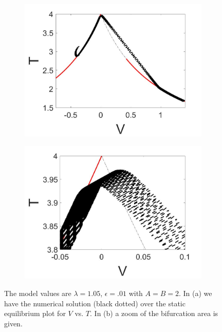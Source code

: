 \begin{figure}[H]
\centering
\begin{subfigure}{.5\textwidth}
 \centering
 \includegraphics[width=\linewidth]{twoD/slowosc_Tplot_medium.jpg}
 \caption{}
\end{subfigure}%
\begin{subfigure}{.5\textwidth}
 \centering
 \includegraphics[width=\linewidth]{twoD/slowosc_Tplot_medium_zoom.jpg}
 \caption{}
\end{subfigure}
\caption{The model values are $\lambda=1.05$, $\epsilon=.01$ with $A=B=2$. In (a) we have the numerical solution (black dotted) over the static equilibrium plot for $V$ vs. $T$. In (b) a zoom of the bifurcation area is given.}
\label{fig:twoD_slowosc_Tnumerics_medium}
\end{figure}

